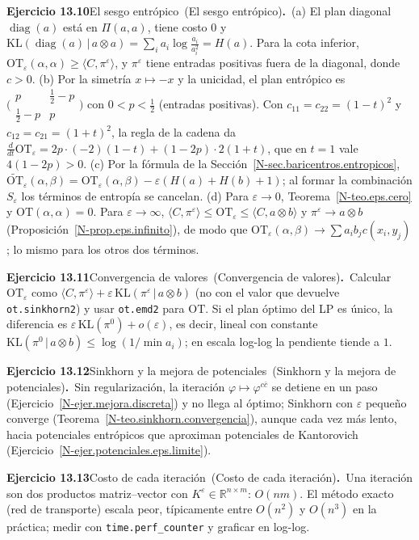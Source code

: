 \documentclass[11pt,a4paper]{amsart}
\newcommand{\ve}{\varepsilon}
\newcommand{\R}{{\mathbb R}}
\theoremstyle{remark}
\theoremstyle{definition}
\numberwithin{subsection}{section}
\numberwithin{equation}{section}
\newcommand{\ejlabel}[2]{\par\medskip\noindent\textbf{Ejercicio #1}\ifx\relax#2\relax\else\ (#2)\fi\textbf{.}\ }
\begin{document}
\ejlabel{13.10}{El sesgo entrópico}(a) El plan diagonal $\operatorname{diag}(a)$ está en $\Pi(a,a)$, tiene costo $0$ y $\mathrm{KL}(\operatorname{diag}(a)\,|\,a\otimes a)=\sum_ia_i\log\frac{a_i}{a_i^2}=H(a)$. Para la cota inferior, $\mathrm{OT}_\ve(\alpha,\alpha)\ge\langle C,\pi^\ve\rangle$, y $\pi^\ve$ tiene entradas positivas fuera de la diagonal, donde $c>0$. (b) Por la simetría $x\mapsto-x$ y la unicidad, el plan entrópico es $\bigl(\begin{smallmatrix}p&\frac12-p\\\frac12-p&p\end{smallmatrix}\bigr)$ con $0<p<\frac12$ (entradas positivas). Con $c_{11}=c_{22}=(1-t)^2$ y $c_{12}=c_{21}=(1+t)^2$, la regla de la cadena da $\frac{d}{dt}\mathrm{OT}_\ve=2p\cdot(-2)(1-t)+(1-2p)\cdot2(1+t)$, que en $t=1$ vale $4(1-2p)>0$. (c) Por la fórmula de la Sección~\ref{N-sec.baricentros.entropicos}, $\widetilde{\mathrm{OT}}_\ve(\alpha,\beta)=\mathrm{OT}_\ve(\alpha,\beta)-\ve(H(a)+H(b)+1)$; al formar la combinación $S_\ve$ los términos de entropía se cancelan. (d) Para $\ve\to0$, Teorema~\ref{N-teo.eps.cero} y $\mathrm{OT}(\alpha,\alpha)=0$. Para $\ve\to\infty$, $\langle C,\pi^\ve\rangle\le\mathrm{OT}_\ve\le\langle C,a\otimes b\rangle$ y $\pi^\ve\to a\otimes b$ (Proposición~\ref{N-prop.eps.infinito}), de modo que $\mathrm{OT}_\ve(\alpha,\beta)\to\sum a_ib_jc(x_i,y_j)$; lo mismo para los otros dos términos.

\ejlabel{13.11}{Convergencia de valores}Calcular $\mathrm{OT}_\ve$ como $\langle C,\pi^\ve\rangle+\ve\,\mathrm{KL}(\pi^\ve\,|\,a\otimes b)$ (no con el valor que devuelve \texttt{ot.sinkhorn2}) y usar \texttt{ot.emd2} para $\mathrm{OT}$. Si el plan óptimo del LP es único, la diferencia es $\ve\,\mathrm{KL}(\pi^0)+o(\ve)$, es decir, lineal con constante $\mathrm{KL}(\pi^0\,|\,a\otimes b)\le\log(1/\min a_i)$; en escala log-log la pendiente tiende a $1$.

\ejlabel{13.12}{Sinkhorn y la mejora de potenciales}Sin regularización, la iteración $\varphi\mapsto\varphi^{c\bar c}$ se detiene en un paso (Ejercicio~\ref{N-ejer.mejora.discreta}) y no llega al óptimo; Sinkhorn con $\ve$ pequeño converge (Teorema~\ref{N-teo.sinkhorn.convergencia}), aunque cada vez más lento, hacia potenciales entrópicos que aproximan potenciales de Kantorovich (Ejercicio~\ref{N-ejer.potenciales.eps.limite}).

\ejlabel{13.13}{Costo de cada iteración}Una iteración son dos productos matriz--vector con $K^\ve\in\R^{n\times m}$: $O(nm)$. El método exacto (red de transporte) escala peor, típicamente entre $O(n^2)$ y $O(n^3)$ en la práctica; medir con \texttt{time.perf\_counter} y graficar en log-log.
\end{document}
